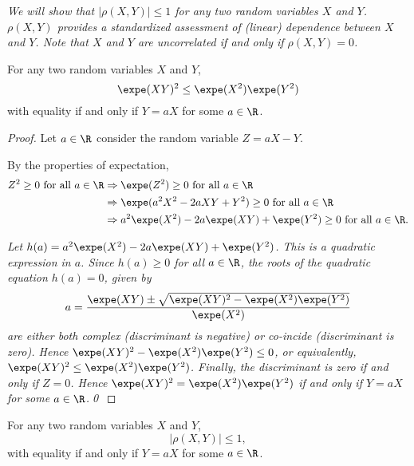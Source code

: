 \begin{remark}
\bit
\it We will show that $|\rho(X,Y)|\leq 1$ for any two random variables $X$ and $Y$.
\it $\rho(X,Y)$ provides a \emph{standardized} assessment of (linear) dependence between $X$ and $Y$.
\it Note that $X$ and $Y$ are uncorrelated if and only if $\rho(X,Y)=0$. 
\eit
\end{remark}
%
\begin{theorem}\label{thm:cauchyschwarz}
For any two random variables $X$ and $Y$, 
\[
\expe(XY)^2\leq\expe(X^2)\expe(Y^2)
\]
with equality if and only if $Y=aX$ for some $a\in\R$.

\end{theorem}

\break %

\begin{proof}
Let $a\in\R$ consider the random variable $Z=aX-Y$. 
\par
By the properties of expectation,
\begin{align*}
Z^2\geq 0 \text{ for all } a\in\R
	& \Rightarrow \expe(Z^2)\geq 0 \text{ for all } a\in\R \\
	& \Rightarrow \expe(a^2X^2 - 2aXY + Y^2) \geq 0 \text{ for all } a\in\R \\
	& \Rightarrow a^2\expe(X^2) - 2a\expe(XY) + \expe(Y^2) \geq 0 \text{ for all } a\in\R.
\end{align*}

\bit
\it Let $h(a)=a^2\expe(X^2) - 2a\expe(XY) + \expe(Y^2)$. This is a quadratic expression in $a$.
\eit
Since $h(a)\geq 0$ for all $a\in\R$, the roots of the quadratic equation $h(a)=0$, given by
\[
a = \frac{\expe(XY)\pm\sqrt{\expe(XY)^2-\expe(X^2)\expe(Y^2)}}{\expe(X^2)}
\]
are either both complex (discriminant is negative) or co-incide (discriminant is zero). 
\bit
\it Hence $\expe(XY)^2-\expe(X^2)\expe(Y^2) \leq 0$, or equivalently, $\expe(XY)^2\leq \expe(X^2)\expe(Y^2)$.
\eit
Finally, the discriminant is zero if and only if $Z=0$.
\bit
\it Hence $\expe(XY)^2=\expe(X^2)\expe(Y^2)$ if and only if $Y=aX$ for some $a\in\R$.\qed
\eit
\end{proof}

\begin{theorem}\label{thm:correlation}
For any two random variables $X$ and $Y$, 
\[
|\rho(X,Y)|\leq 1,
\]
with equality if and only if $Y=aX$ for some $a\in\R$.
\end{theorem}

